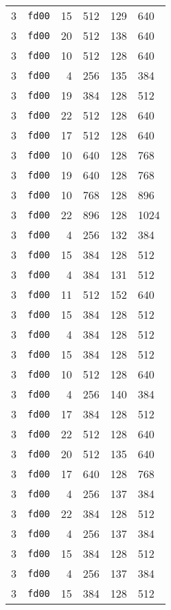 \documentclass{article}
\begin{document}
\begin{table}[h!]
\begin{tabular}{llrrrl}
    3 & \texttt{fd00} & 15 & 512 & 129 & 640 \\
    3 & \texttt{fd00} & 20 & 512 & 138 & 640 \\
    3 & \texttt{fd00} & 10 & 512 & 128 & 640 \\
    3 & \texttt{fd00} & 4 & 256 & 135 & 384 \\
    3 & \texttt{fd00} & 19 & 384 & 128 & 512 \\
    3 & \texttt{fd00} & 22 & 512 & 128 & 640 \\
    3 & \texttt{fd00} & 17 & 512 & 128 & 640 \\
    3 & \texttt{fd00} & 10 & 640 & 128 & 768 \\
    3 & \texttt{fd00} & 19 & 640 & 128 & 768 \\
    3 & \texttt{fd00} & 10 & 768 & 128 & 896 \\
    3 & \texttt{fd00} & 22 & 896 & 128 & 1024 \\
    3 & \texttt{fd00} & 4 & 256 & 132 & 384 \\
    3 & \texttt{fd00} & 15 & 384 & 128 & 512 \\
    3 & \texttt{fd00} & 4 & 384 & 131 & 512 \\
    3 & \texttt{fd00} & 11 & 512 & 152 & 640 \\
    3 & \texttt{fd00} & 15 & 384 & 128 & 512 \\
    3 & \texttt{fd00} & 4 & 384 & 128 & 512 \\
    3 & \texttt{fd00} & 15 & 384 & 128 & 512 \\
    3 & \texttt{fd00} & 10 & 512 & 128 & 640 \\
    3 & \texttt{fd00} & 4 & 256 & 140 & 384 \\
    3 & \texttt{fd00} & 17 & 384 & 128 & 512 \\
    3 & \texttt{fd00} & 22 & 512 & 128 & 640 \\
    3 & \texttt{fd00} & 20 & 512 & 135 & 640 \\
    3 & \texttt{fd00} & 17 & 640 & 128 & 768 \\
    3 & \texttt{fd00} & 4 & 256 & 137 & 384 \\
    3 & \texttt{fd00} & 22 & 384 & 128 & 512 \\
    3 & \texttt{fd00} & 4 & 256 & 137 & 384 \\
    3 & \texttt{fd00} & 15 & 384 & 128 & 512 \\
    3 & \texttt{fd00} & 4 & 256 & 137 & 384 \\
    3 & \texttt{fd00} & 15 & 384 & 128 & 512 \\

\end{tabular}
\end{table}
\end{document}
